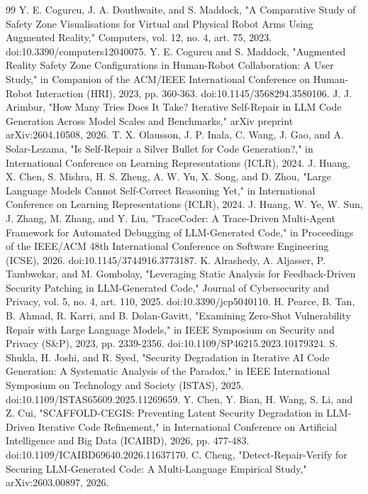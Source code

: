\documentclass{ieeeaccess}
\begin{document}
\begin{thebibliography}{99}
 Y. E. Cogurcu, J. A. Douthwaite, and S. Maddock, "A Comparative Study of Safety Zone Visualisations for Virtual and Physical Robot Arms Using Augmented Reality," Computers, vol. 12, no. 4, art. 75, 2023. doi:10.3390/computers12040075.
 Y. E. Cogurcu and S. Maddock, "Augmented Reality Safety Zone Configurations in Human-Robot Collaboration: A User Study," in Companion of the ACM/IEEE International Conference on Human-Robot Interaction (HRI), 2023, pp. 360-363. doi:10.1145/3568294.3580106.
 J. J. Arimbur, "How Many Tries Does It Take? Iterative Self-Repair in LLM Code Generation Across Model Scales and Benchmarks," arXiv preprint arXiv:2604.10508, 2026.
 T. X. Olausson, J. P. Inala, C. Wang, J. Gao, and A. Solar-Lezama, "Is Self-Repair a Silver Bullet for Code Generation?," in International Conference on Learning Representations (ICLR), 2024.
 J. Huang, X. Chen, S. Mishra, H. S. Zheng, A. W. Yu, X. Song, and D. Zhou, "Large Language Models Cannot Self-Correct Reasoning Yet," in International Conference on Learning Representations (ICLR), 2024.
 J. Huang, W. Ye, W. Sun, J. Zhang, M. Zhang, and Y. Liu, "TraceCoder: A Trace-Driven Multi-Agent Framework for Automated Debugging of LLM-Generated Code," in Proceedings of the IEEE/ACM 48th International Conference on Software Engineering (ICSE), 2026. doi:10.1145/3744916.3773187.
 K. Alrashedy, A. Aljasser, P. Tambwekar, and M. Gombolay, "Leveraging Static Analysis for Feedback-Driven Security Patching in LLM-Generated Code," Journal of Cybersecurity and Privacy, vol. 5, no. 4, art. 110, 2025. doi:10.3390/jcp5040110.
 H. Pearce, B. Tan, B. Ahmad, R. Karri, and B. Dolan-Gavitt, "Examining Zero-Shot Vulnerability Repair with Large Language Models," in IEEE Symposium on Security and Privacy (S\&P), 2023, pp. 2339-2356. doi:10.1109/SP46215.2023.10179324.
 S. Shukla, H. Joshi, and R. Syed, "Security Degradation in Iterative AI Code Generation: A Systematic Analysis of the Paradox," in IEEE International Symposium on Technology and Society (ISTAS), 2025. doi:10.1109/ISTAS65609.2025.11269659.
 Y. Chen, Y. Bian, H. Wang, S. Li, and Z. Cui, "SCAFFOLD-CEGIS: Preventing Latent Security Degradation in LLM-Driven Iterative Code Refinement," in International Conference on Artificial Intelligence and Big Data (ICAIBD), 2026, pp. 477-483. doi:10.1109/ICAIBD69640.2026.11637170.
 C. Cheng, "Detect-Repair-Verify for Securing LLM-Generated Code: A Multi-Language Empirical Study," arXiv:2603.00897, 2026.

\end{thebibliography}
\end{document}

